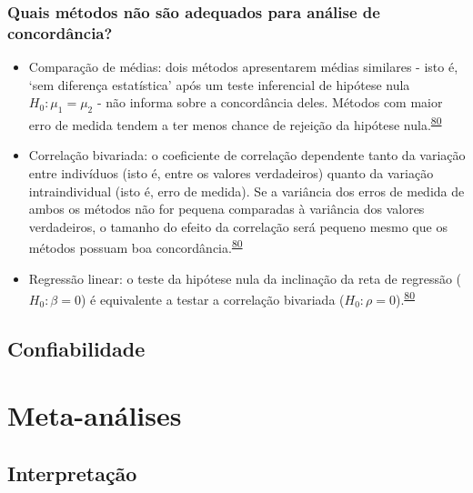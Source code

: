 \documentclass[
]{book}
\begin{document}
\hypertarget{quais-muxe9todos-nuxe3o-suxe3o-adequados-para-anuxe1lise-de-concorduxe2ncia}{%
\subsection{Quais métodos não são adequados para análise de concordância?}\label{quais-muxe9todos-nuxe3o-suxe3o-adequados-para-anuxe1lise-de-concorduxe2ncia}}

\begin{itemize}
\item
  Comparação de médias: dois métodos apresentarem médias similares - isto é, `sem diferença estatística' após um teste inferencial de hipótese nula \(H_{0}:\mu_{1} = \mu_{2}\) - não informa sobre a concordância deles. Métodos com maior erro de medida tendem a ter menos chance de rejeição da hipótese nula.\textsuperscript{\protect\hyperlink{ref-altman1983}{80}}
\item
  Correlação bivariada: o coeficiente de correlação dependente tanto da variação entre indivíduos (isto é, entre os valores verdadeiros) quanto da variação intraindividual (isto é, erro de medida). Se a variância dos erros de medida de ambos os métodos não for pequena comparadas à variância dos valores verdadeiros, o tamanho do efeito da correlação será pequeno mesmo que os métodos possuam boa concordância.\textsuperscript{\protect\hyperlink{ref-altman1983}{80}}
\item
  Regressão linear: o teste da hipótese nula da inclinação da reta de regressão (\(H_{0}:\beta = 0\)) é equivalente a testar a correlação bivariada (\(H_{0}:\rho = 0\)).\textsuperscript{\protect\hyperlink{ref-altman1983}{80}}
\end{itemize}

\hypertarget{confiabilidade}{%
\section{Confiabilidade}\label{confiabilidade}}

\hypertarget{meta-analises}{%
\chapter{\texorpdfstring{\textbf{Meta-análises}}{Meta-análises}}\label{meta-analises}}

\hypertarget{interpretacao}{%
\section{Interpretação}\label{interpretacao}}
\end{document}

